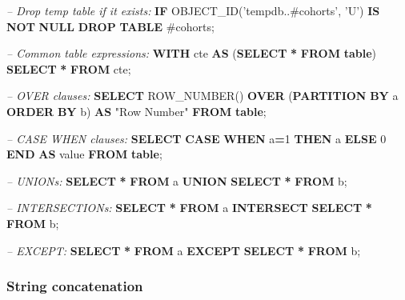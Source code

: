 \documentclass[11pt]{book}
\newenvironment{Shaded}{\begin{snugshade}}{\end{snugshade}}
\newcommand{\CommentTok}[1]{\textcolor[rgb]{0.56,0.35,0.01}{\textit{#1}}}
\newcommand{\ControlFlowTok}[1]{\textcolor[rgb]{0.13,0.29,0.53}{\textbf{#1}}}
\newcommand{\DecValTok}[1]{\textcolor[rgb]{0.00,0.00,0.81}{#1}}
\newcommand{\FunctionTok}[1]{\textcolor[rgb]{0.00,0.00,0.00}{#1}}
\newcommand{\KeywordTok}[1]{\textcolor[rgb]{0.13,0.29,0.53}{\textbf{#1}}}
\newcommand{\NormalTok}[1]{#1}
\newcommand{\OperatorTok}[1]{\textcolor[rgb]{0.81,0.36,0.00}{\textbf{#1}}}
\newcommand{\OtherTok}[1]{\textcolor[rgb]{0.56,0.35,0.01}{#1}}
\newcommand{\StringTok}[1]{\textcolor[rgb]{0.31,0.60,0.02}{#1}}
\theoremstyle{definition}
\theoremstyle{definition}
\theoremstyle{definition}
\theoremstyle{remark}
\begin{document}
\begin{Shaded}
\begin{Highlighting}[]
\CommentTok{-- Drop temp table if it exists:}
\ControlFlowTok{IF}\NormalTok{ OBJECT_ID(}\StringTok{'tempdb..#cohorts'}\NormalTok{, }\StringTok{'U'}\NormalTok{) }\KeywordTok{IS} \KeywordTok{NOT} \KeywordTok{NULL}
  \KeywordTok{DROP} \KeywordTok{TABLE}\NormalTok{ #cohorts;  }

\CommentTok{-- Common table expressions:}
\KeywordTok{WITH}\NormalTok{ cte }\KeywordTok{AS}\NormalTok{ (}\KeywordTok{SELECT} \OperatorTok{*} \KeywordTok{FROM} \KeywordTok{table}\NormalTok{) }\KeywordTok{SELECT} \OperatorTok{*} \KeywordTok{FROM}\NormalTok{ cte;}

\CommentTok{-- OVER clauses:}
\KeywordTok{SELECT} \FunctionTok{ROW_NUMBER}\NormalTok{() }\KeywordTok{OVER}\NormalTok{ (}\KeywordTok{PARTITION} \KeywordTok{BY}\NormalTok{ a }\KeywordTok{ORDER} \KeywordTok{BY}\NormalTok{ b)}
  \KeywordTok{AS} \OtherTok{"Row Number"} \KeywordTok{FROM} \KeywordTok{table}\NormalTok{;}
  
\CommentTok{-- CASE WHEN clauses:}
\KeywordTok{SELECT} \ControlFlowTok{CASE} \ControlFlowTok{WHEN}\NormalTok{ a}\OperatorTok{=}\DecValTok{1} \ControlFlowTok{THEN}\NormalTok{ a }\ControlFlowTok{ELSE} \DecValTok{0} \ControlFlowTok{END} \KeywordTok{AS} \FunctionTok{value} \KeywordTok{FROM} \KeywordTok{table}\NormalTok{;}

\CommentTok{-- UNIONs:}
\KeywordTok{SELECT} \OperatorTok{*} \KeywordTok{FROM}\NormalTok{ a }\KeywordTok{UNION} \KeywordTok{SELECT} \OperatorTok{*} \KeywordTok{FROM}\NormalTok{ b;}

\CommentTok{-- INTERSECTIONs:}
\KeywordTok{SELECT} \OperatorTok{*} \KeywordTok{FROM}\NormalTok{ a }\KeywordTok{INTERSECT} \KeywordTok{SELECT} \OperatorTok{*} \KeywordTok{FROM}\NormalTok{ b;}

\CommentTok{-- EXCEPT:}
\KeywordTok{SELECT} \OperatorTok{*} \KeywordTok{FROM}\NormalTok{ a }\KeywordTok{EXCEPT} \KeywordTok{SELECT} \OperatorTok{*} \KeywordTok{FROM}\NormalTok{ b;}
\end{Highlighting}
\end{Shaded}

\hypertarget{string-concatenation}{%
\subsubsection*{String concatenation}\label{string-concatenation}}
\end{document}
